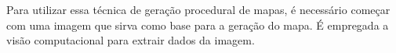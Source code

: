 Para utilizar essa técnica de geração procedural de mapas, é necessário começar com uma imagem que sirva como base para a geração do mapa. É empregada a visão computacional para extrair dados da imagem.